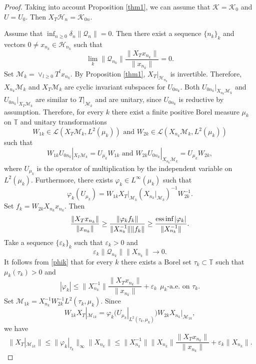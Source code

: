\documentclass[a4paper,oneside,11pt]{amsart}
\numberwithin{equation}{section}
\theoremstyle{plain}
\theoremstyle{definition}
\begin{document}
\begin{proof} Taking into account Proposition \ref{thm1}, we can assume that $\mathcal K=\mathcal K_0$ and $U=U_0$. 
Then $X_T\mathcal H_n=\mathcal K_{0n}$.

Assume that $\inf_{n\geq 0} \delta_n\|\mathcal Q_n\|=0$. Then there exist a sequence $\{n_k\}_k$ and vectors 
$0\neq x_{n_k}\in\mathcal H_{n_k}$ such that 
\begin{equation} \label{assumcontr}\lim_k\|\mathcal Q_{n_k}\|\frac{\|X_Tx_{n_k}\|}{\|x_{n_k}\|}=0.\end{equation}
Set $\mathcal M_k=\vee_{l\geq 0}T^lx_{n_k}$. By Proposition \ref{thm1},  $X_T|_{\mathcal H_{n_k}}$ is invertible.  
Therefore,  $X_{n_k}\mathcal M_k$ and  $X_T\mathcal M_k$ are cyclic invariant subspaces for $U_{0n_k}$.  
 Both $U_{0n_k}|_{X_{n_k}\mathcal M_k}$ and $U_{0n_k}|_{X_T\mathcal M_k}$ are similar to $T|_{\mathcal M_k}$ and are unitary, 
since $U_{0n_k}$ is reductive by assumption. 
Therefore, for every $k$ there exist a finite positive Borel measure $\mu_k$ on $\mathbb T$ and   unitary transformations  
$$ W_{1k}\in\mathcal L(X_T\mathcal M_k,L^2(\mu_k)) \text{ and } W_{2k}\in\mathcal L(X_{n_k}\mathcal M_k,L^2(\mu_k))$$
such that 
$$W_{1k}U_{0n_k}|_{X_T\mathcal M_k}=U_{\mu_k}W_{1k} \text{ and } W_{2k}U_{0n_k}|_{X_{n_k}\mathcal M_k}=U_{\mu_k}W_{2k},$$
where $U_{\mu_k}$ is the operator of multiplication by the independent variable on $L^2(\mu_k)$. 
Furthermore, there exists $\varphi_k\in L^\infty(\mu_k)$ such that 
$$ \varphi_k(U_{\mu_k})=W_{1k}X_T|_{\mathcal M_k}(X_{n_k}|_{\mathcal M_k})^{-1}W_{2k}^{-1}.$$
Set $f_k=W_{2k}X_{n_k}x_{n_k}$. Then
\begin{equation} \label{phik}\frac{\|X_Tx_{n_k}\|}{\|x_{n_k}\|}\geq \frac{\|\varphi_k f_k\|}{\|X_{n_k}^{-1}\|\|f_k\|}\geq 
 \frac{\mathop{\text{\rm ess\,inf}}|\varphi_k|}{\|X_{n_k}^{-1}\|}.\end{equation} 
Take a sequence $\{\varepsilon_k\}_k$ such that $\varepsilon_k>0$ and 
$$ \varepsilon_k\|\mathcal Q_{n_k}\|\|X_{n_k}\|\to 0.$$
 It follows from \eqref{phik} that for every $k$ there exists a Borel set $\tau_k\subset\mathbb T$ such that $\mu_k(\tau_k)>0$ 
and $$|\varphi_k|\leq \|X_{n_k}^{-1}\|\frac{\|X_Tx_{n_k}\|}{\|x_{n_k}\|}+\varepsilon_k\ \ \mu_k\text{-a.e. on } \tau_k.$$
Set $\mathcal M_{1k}=X_{n_k}^{-1}W_{2k}^{-1}L^2(\tau_k,\mu_k)$. 
Since 
$$W_{1k}X_T|_{\mathcal M_{1k}}=\varphi_k(U_{\mu_k}|_{L^2(\tau_k,\mu_k)})W_{2k}X_{n_k}|_{\mathcal M_{1k}},$$
we have $$\|X_T|_{\mathcal M_{1k}}\|\leq\|\varphi_k|_{\tau_k}\|_\infty\|X_{n_k}\|\leq
\|X_{n_k}^{-1}\|\|X_{n_k}\|\frac{\|X_Tx_{n_k}\|}{\|x_{n_k}\|}+\varepsilon_k\|X_{n_k}\|.$$

\end{proof}
\end{document}
